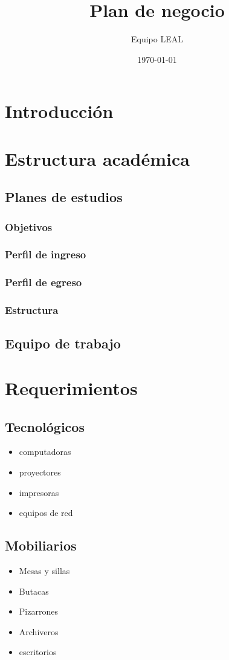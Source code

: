\documentclass[11pt,spanish,lettersize,twocolumn]{article}
\title{Plan de negocio}
\author{Equipo LEAL}
\date{\today}
\begin{document}
\maketitle
\tableofcontents

\section{Introducci\'on}

\section{Estructura acad\'emica}
\subsection{Planes de estudios}
\subsubsection{Objetivos}
\subsubsection{Perfil de ingreso}
\subsubsection{Perfil de egreso}
\subsubsection{Estructura}
\subsection{Equipo de trabajo}

\section{Requerimientos}
\subsection{Tecnol\'ogicos}
\begin{itemize}
\item computadoras
\item proyectores
\item impresoras
\item equipos de red
\end{itemize}
\subsection{Mobiliarios}
\begin{itemize}
\item Mesas y sillas
\item Butacas
\item Pizarrones
\item Archiveros
\item escritorios
\end{itemize}
\end{document}
